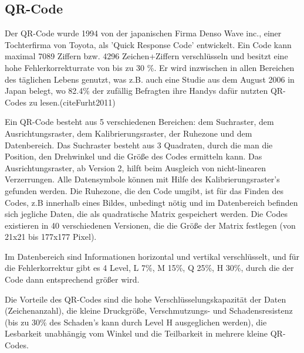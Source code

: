 \subsection*{QR-Code}
Der QR-Code wurde 1994 von der japanischen Firma Denso Wave inc., einer Tochterfirma von Toyota, als 'Quick Response Code' entwickelt. Ein Code kann maximal 7089 Ziffern bzw. 4296 Zeichen+Ziffern verschlüsseln und besitzt eine hohe Fehlerkorrekturrate von bis zu 30 \%. Er wird inzwischen in allen Bereichen des täglichen Lebens genutzt, was z.B. auch eine Studie aus dem August 2006 in Japan belegt, wo 82.4\% der zufällig Befragten ihre Handys dafür nutzten QR-Codes zu lesen.(cite{Furht2011})

Ein QR-Code besteht aus 5 verschiedenen Bereichen: dem Suchraster, dem Ausrichtungsraster, dem Kalibrierungsraster, der Ruhezone und dem Datenbereich. Das Suchraster besteht aus 3 Quadraten, durch die man die Position, den Drehwinkel und die Größe des Codes ermitteln kann. Das Ausrichtungsraster, ab Version 2, hilft beim Ausgleich von nicht-linearen Verzerrungen. Alle Datensymbole können mit Hilfe des Kalibrierungsraster's gefunden werden. Die Ruhezone, die den Code umgibt, ist für das Finden des Codes, z.B innerhalb eines Bildes, unbedingt nötig und im Datenbereich befinden sich jegliche Daten, die als quadratische Matrix gespeichert werden. Die Codes existieren in 40 verschiedenen Versionen, die die Größe der Matrix festlegen (von 21x21 bis 177x177 Pixel).

Im Datenbereich sind Informationen horizontal und vertikal verschlüsselt, und für die Fehlerkorrektur gibt es 4 Level, L 7\%, M 15\%, Q 25\%, H 30\%, durch die der Code dann entsprechend größer wird.

Die Vorteile des QR-Codes sind die hohe Verschlüsselungskapazität der Daten (Zeichenanzahl), die kleine Druckgröße, Verschmutzungs- und Schadensresistenz (bis zu 30\% des Schaden's kann durch Level H ausgeglichen werden), die Lesbarkeit unabhängig vom Winkel und die Teilbarkeit in mehrere kleine QR-Codes.

